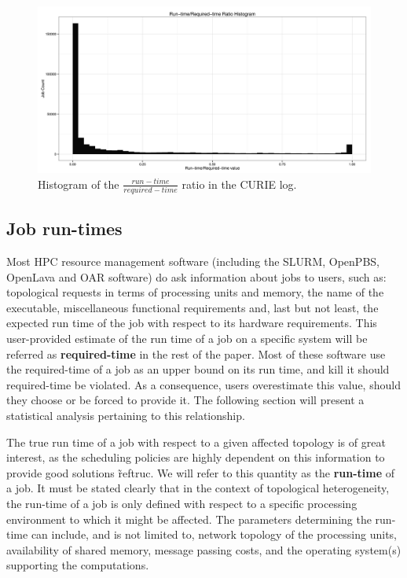 \documentclass{article}
\begin{document}
\begin{figure}[b]
  \centering
  \includegraphics[width=\textwidth]{reqrun-1.png}
  \caption{Histogram of the $\frac{run-time}{required-time}$ ratio in the CURIE log.}
  \label{fig:ratio}
\end{figure}

\subsection{Job run-times}
Most HPC resource management software (including the SLURM, OpenPBS, OpenLava and OAR software) do ask information about jobs to users, such as: topological requests in terms of processing units and memory, the name of the executable, miscellaneous functional requirements and, last but not least, the expected run time of the job with respect to its hardware requirements.
This user-provided estimate of the run time of a job on a specific system will be referred as \textbf{required-time} in the rest of the paper. Most of these software use the required-time of a job as an upper bound on its run time, and kill it should required-time be violated. As a consequence, users overestimate this value, should they choose or be forced to provide it. The following section will present a statistical analysis pertaining to this relationship.

The true run time of a job with respect to a given affected topology is of great interest, as the scheduling policies are highly dependent on this information to provide good solutions \~ref{truc}. We will refer to this quantity as the \textbf{run-time} of a job.
It must be stated clearly that in the context of topological heterogeneity, the run-time of a job is only defined with respect to a specific processing environment to which it might be affected.
The parameters determining the run-time can include, and is not limited to, network topology of the processing units, availability of shared memory, message passing costs, and the operating system(s) supporting the computations.
\end{document}
